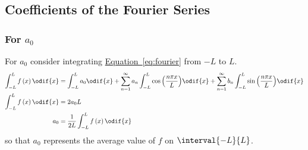 \documentclass{article}
\begin{document}
\subsection{Coefficients of the Fourier Series}
\subsubsection{For \texorpdfstring{\(a_0\)}{a0}}
For \(a_0\) consider integrating \hyperref[eq:fourier]{Equation~\ref{eq:fourier}} from \(-L\) to \(L\).
\begin{align*}
    \int_{-L}^L f\left( x \right) \odif{x} & = \int_{-L}^L a_0 \odif{x} + \sum_{n = 1}^\infty a_n \int_{-L}^L \cos{\left( \frac{n \pi x}{L} \right)} \odif{x} + \sum_{n = 1}^\infty b_n \int_{-L}^L \sin{\left( \frac{n \pi x}{L} \right)} \odif{x} \\
    \int_{-L}^L f\left( x \right) \odif{x} & = 2 a_0 L                                                                                                                                                                                              \\
    a_0                                    & = \frac{1}{2L} \int_{-L}^L f\left( x \right) \odif{x}
\end{align*}
so that \(a_0\) represents the average value of \(f\) on \(\interval{-L}{L}\).
\end{document}
